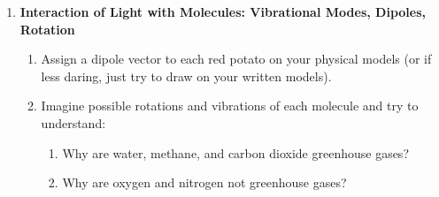\documentclass[12pt]{article}
\begin{document}
\begin{enumerate}
\newpage
\item {\bf Interaction of Light with Molecules: Vibrational Modes,  Dipoles, Rotation}
	\begin{enumerate}
	\item Assign a dipole vector to each red potato on your physical models (or if less daring, just try to draw on your written models).  
	\item Imagine possible rotations and vibrations of each molecule and try to understand:
		\begin{enumerate}
		\item Why are water, methane, and carbon dioxide greenhouse gases?  
		\item Why are oxygen and nitrogen not greenhouse gases?
		\end{enumerate}
	\end{enumerate}



\end{enumerate}
	







\end{document}
